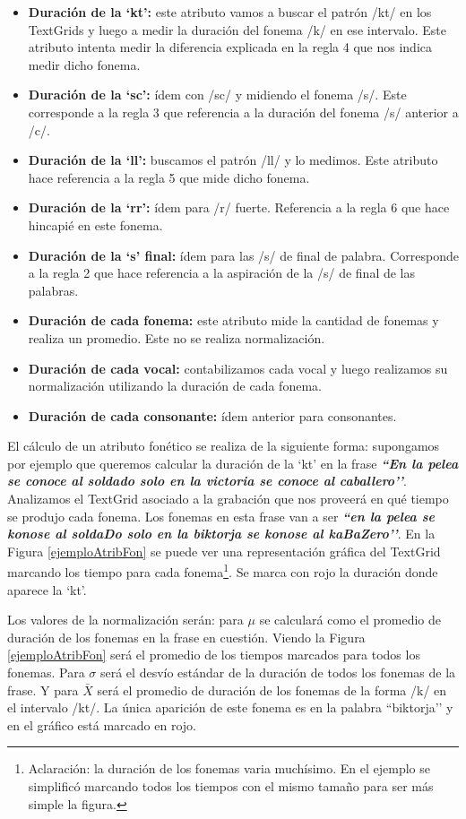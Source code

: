 \begin{itemize}
    \item \textbf{Duración de la `kt’:} este atributo vamos a buscar el patrón /kt/ en los TextGrids y luego a medir la duración del fonema /k/ en ese intervalo. Este atributo intenta medir la diferencia explicada en la regla 4 que nos indica medir dicho fonema.
    \item \textbf{Duración de la `sc’:} ídem con /sc/ y midiendo el fonema /s/. Este corresponde a la regla 3 que referencia a la duración del fonema /s/ anterior a /c/.  
    \item \textbf{Duración de la `ll’:} buscamos el patrón /ll/ y lo medimos. Este atributo hace referencia a la regla 5 que mide dicho fonema.
    \item \textbf{Duración de la `rr’:} ídem para /r/ fuerte. Referencia a la regla 6 que hace hincapié en este fonema.
    \item \textbf{Duración de la `s’ final:} ídem para las /s/ de final de palabra. Corresponde a la regla 2 que hace referencia a la aspiración de la /s/ de final de las palabras.  
    \item \textbf{Duración de cada fonema:} este atributo mide la cantidad de fonemas y realiza un promedio. Este no se realiza normalización.  
    \item \textbf{Duración de cada vocal:} contabilizamos cada vocal y luego realizamos su normalización utilizando la duración de cada fonema.
    \item \textbf{Duración de cada consonante:} ídem anterior para consonantes. 
\end{itemize}

El cálculo de un atributo fonético se realiza de la siguiente forma: supongamos por ejemplo que queremos calcular la duración de la `kt’ en la frase \textbf{\textit{``En la pelea se conoce al soldado solo en la victoria se conoce al caballero’’}}. Analizamos el TextGrid asociado a la grabación que nos proveerá en qué tiempo se produjo cada fonema. Los fonemas en esta frase van a ser \textbf{\textit{``en la pelea se konose al soldaDo solo en la biktorja se konose al kaBaZero’’}}. En la Figura \ref{ejemploAtribFon} se puede ver una representación gráfica del TextGrid marcando los tiempo para cada fonema\footnote{Aclaración: la duración de los fonemas varia muchísimo. En el ejemplo se simplificó marcando todos los tiempos con el mismo tamaño para ser más simple la figura.}. Se marca con rojo la duración donde aparece la `kt’.

Los valores de la normalización serán: para $\mu$ se calculará como el promedio de duración de los fonemas en la frase en cuestión. Viendo la Figura \ref{ejemploAtribFon} será el promedio de los tiempos marcados para todos los fonemas. Para $\sigma$ será el desvío estándar de la duración de todos los fonemas de la frase. Y para $\bar{X}$ será el promedio de duración de los fonemas de la forma /k/ en el intervalo /kt/. La única aparición de este fonema es en la palabra ``biktorja’’ y en el gráfico está marcado en rojo.


